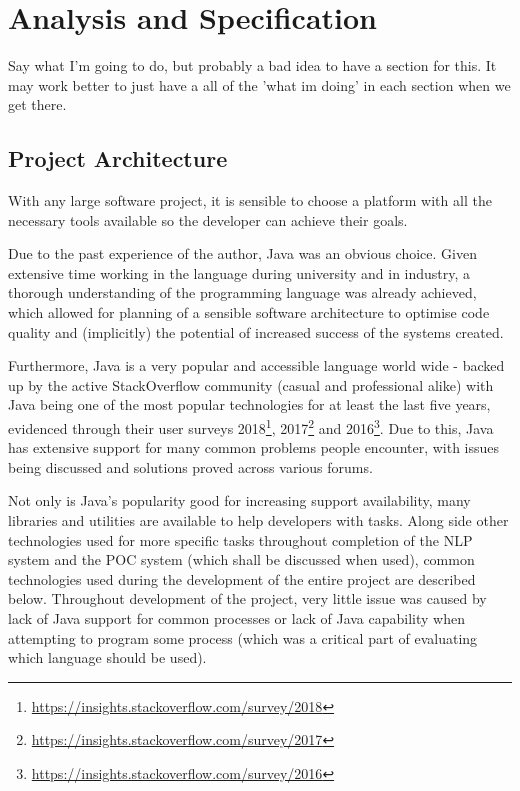 \chapter{Analysis and Specification}
Say what I'm going to do, but probably a bad idea to have a section for this. It may work better to just have a all of the 'what im doing' in each section when we get there.

\section{Project Architecture}
With any large software project, it is sensible to choose a platform with all the necessary tools available so the developer can achieve their goals. 

Due to the past experience of the author, Java was an obvious choice. Given extensive time working in the language during university and in industry, a thorough understanding of the programming language was already achieved, which allowed for planning of a sensible software architecture to optimise code quality and (implicitly) the potential of increased success of the systems created. 

Furthermore, Java is a very popular and accessible language world wide - backed up by the active StackOverflow community (casual and professional alike) with Java being one of the most popular technologies for at least the last five years, evidenced through their user surveys 2018\footnote{\href{https://insights.stackoverflow.com/survey/2018}{https://insights.stackoverflow.com/survey/2018}}, 2017\footnote{\href{https://insights.stackoverflow.com/survey/2017}{https://insights.stackoverflow.com/survey/2017}} and 2016\footnote{\href{https://insights.stackoverflow.com/survey/2016}{https://insights.stackoverflow.com/survey/2016}}. Due to this, Java has extensive support for many common problems people encounter, with issues being discussed and solutions proved across various forums. 

Not only is Java's popularity good for increasing support availability, many libraries and utilities are available to help developers with tasks. Along side other technologies used for more specific tasks throughout completion of the NLP system and the POC system (which shall be discussed when used), common technologies used during the development of the entire project are described below. Throughout development of the project, very little issue was caused by lack of Java support for common processes or lack of Java capability when attempting to program some process (which was a critical part of evaluating which language should be used). 

